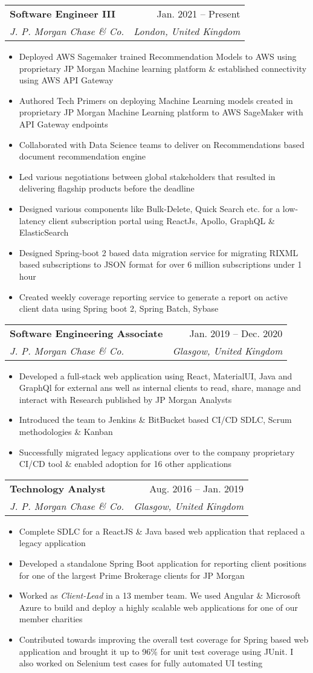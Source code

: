 \documentclass[letterpaper,11pt]{article}
\makeatletter
\newcommand{\resumeItem}[1]{
  \item\small{
    {#1 \vspace{-2pt}}
  }
}
\newcommand{\resumeSubheading}[4]{
  \vspace{-2pt}\item
    \begin{tabular*}{0.97\textwidth}[t]{l@{\extracolsep{\fill}}r}
      \textbf{#1} & #2 \\
      \textit{\small#3} & \textit{\small #4} \\
    \end{tabular*}\vspace{-7pt}
}
\newcommand{\resumeSubSubheading}[2]{
    \item
    \begin{tabular*}{0.97\textwidth}{l@{\extracolsep{\fill}}r}
      \textit{\small#1} & \textit{\small #2} \\
    \end{tabular*}\vspace{-7pt}
}
\newcommand{\resumeSubHeadingListEnd}{\end{itemize}}
\newcommand{\resumeItemListStart}{\begin{itemize}}
\newcommand{\resumeItemListEnd}{\end{itemize}\vspace{-5pt}}
\makeatother
\begin{document}
\resumeSubheading
{Software Engineer III}{ Jan. 2021 – Present}
{J. P. Morgan Chase \& Co.}{London, United Kingdom}
\resumeItemListStart
\resumeItem{Deployed AWS Sagemaker trained Recommendation Models to AWS using proprietary JP Morgan Machine learning platform \& established connectivity using AWS API Gateway}
\resumeItem{Authored Tech Primers on deploying Machine Learning models created in proprietary JP Morgan Machine Learning platform to AWS SageMaker with API Gateway endpoints}
\resumeItem{Collaborated with Data Science teams to deliver on Recommendations based document recommendation engine }
\resumeItem{Led various negotiations between global stakeholders that resulted in delivering flagship products before the deadline}
\resumeItem{Designed various components like Bulk-Delete, Quick Search etc. for a low-latency client subscription portal using ReactJs, Apollo, GraphQL \& ElasticSearch}
\resumeItem{Designed Spring-boot 2 based data migration service for migrating RIXML based subscriptions to JSON format for over 6 million subscriptions under 1 hour}
\resumeItem{Created weekly coverage reporting service to generate a report on active client data using Spring boot 2, Spring Batch, Sybase}
\resumeItemListEnd
\resumeSubheading
{Software Engineering Associate}{Jan. 2019 -- Dec. 2020}
{J. P. Morgan Chase \& Co.}{Glasgow, United Kingdom}
\resumeItemListStart
\resumeItem{Developed a full-stack web application using React, MaterialUI, Java and GraphQl for external ans well as internal clients to read, share, manage and interact with Research published by JP Morgan Analysts}
\resumeItem{Introduced the team to Jenkins \& BitBucket based CI/CD SDLC, Scrum methodologies \& Kanban}
\resumeItem{Successfully migrated legacy applications over to the company proprietary CI/CD tool \&
	enabled adoption for 16 other applications}
\resumeItemListEnd


\resumeSubheading
{Technology Analyst}{Aug. 2016 -- Jan. 2019}
{J. P. Morgan Chase \& Co.}{Glasgow, United Kingdom}
\resumeItemListStart
\resumeItem{Complete SDLC for a ReactJS \& Java based web application that replaced a legacy application}
\resumeItem{Developed a standalone Spring Boot application for reporting client positions for one of the largest Prime Brokerage clients for JP Morgan}
\resumeItem{Worked as \emph{Client-Lead} in a 13 member team. We used Angular \& Microsoft Azure to build and deploy a highly scalable web applications for one of our member charities}
\resumeItem{Contributed towards improving the overall test coverage for Spring based web application and brought it up to 96\% for unit test coverage using JUnit. I also worked on Selenium test cases for fully automated UI testing}
\resumeItemListEnd
\end{document}
